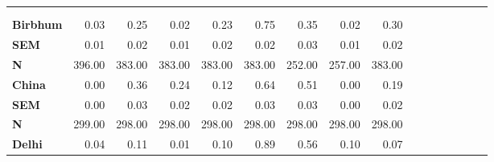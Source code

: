 \begin{tabular}{@{\extracolsep{5pt}}lrrrrrrrrrrrrrrr}
\toprule
&  &  &  &  &  &  &  &  \\
{\bf } &  &  &  &  &  &  &  &  \\
\hline
{\bf Birbhum} & 0.03\phantom{***} & 0.25\phantom{***} & 0.02\phantom{***} & 0.23\phantom{***} & 0.75\phantom{***} & 0.35\phantom{***} & 0.02\phantom{***} & 0.30\phantom{***} \\
{\bf SEM} & 0.01\phantom{***} & 0.02\phantom{***} & 0.01\phantom{***} & 0.02\phantom{***} & 0.02\phantom{***} & 0.03\phantom{***} & 0.01\phantom{***} & 0.02\phantom{***} \\
{\bf N} & 396.00\phantom{***} & 383.00\phantom{***} & 383.00\phantom{***} & 383.00\phantom{***} & 383.00\phantom{***} & 252.00\phantom{***} & 257.00\phantom{***} & 383.00\phantom{***} \\
{\bf China} & 0.00\phantom{***} & 0.36\phantom{***} & 0.24\phantom{***} & 0.12\phantom{***} & 0.64\phantom{***} & 0.51\phantom{***} & 0.00\phantom{***} & 0.19\phantom{***} \\
{\bf SEM} & 0.00\phantom{***} & 0.03\phantom{***} & 0.02\phantom{***} & 0.02\phantom{***} & 0.03\phantom{***} & 0.03\phantom{***} & 0.00\phantom{***} & 0.02\phantom{***} \\
{\bf N} & 299.00\phantom{***} & 298.00\phantom{***} & 298.00\phantom{***} & 298.00\phantom{***} & 298.00\phantom{***} & 298.00\phantom{***} & 298.00\phantom{***} & 298.00\phantom{***} \\
{\bf Delhi} & 0.04\phantom{***} & 0.11\phantom{***} & 0.01\phantom{***} & 0.10\phantom{***} & 0.89\phantom{***} & 0.56\phantom{***} & 0.10\phantom{***} & 0.07\phantom{***} \\

\end{tabular}
